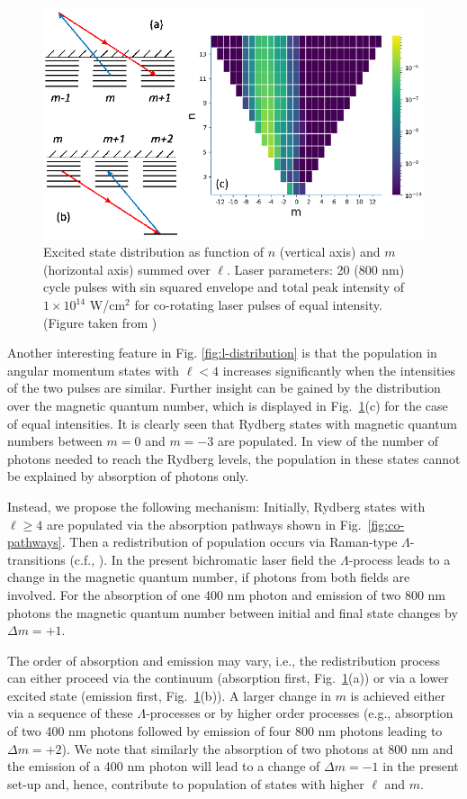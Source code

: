 \begin{figure}[!ht]
\centering
\includegraphics[width=0.6\columnwidth]{figs/Rydberg/Gebre-bicircular-Fig4.png}
\caption{\label{fig:nm-distribution}
Excited state distribution as function of $n$ (vertical axis) and $m$ (horizontal axis) summed over $\ell$. Laser parameters: 20 (800 nm) cycle pulses with sin squared envelope and total peak intensity of $1\times10^{14}$ W/cm$^2$ for co-rotating laser pulses of equal intensity. (Figure taken from \cite{venzke2020_ryd})
}
\end{figure}

Another interesting feature in Fig. \ref{fig:l-distribution} is that the population in angular momentum states with $\ell < 4$ increases significantly when the intensities of the two pulses are similar. Further insight can be gained by the distribution over the magnetic quantum number, which is displayed in Fig.~\ref{fig:nm-distribution}(c) for the case of equal intensities. It is clearly seen that Rydberg states with magnetic quantum numbers between $m=0$ and $m=-3$ are populated. In view of the number of photons needed to reach the Rydberg levels, the population in these states cannot be explained by absorption of photons only. 

Instead, we propose the following mechanism: Initially, Rydberg states with $\ell \ge 4$ are populated via the absorption pathways shown in Fig.\ \ref{fig:co-pathways}. Then a redistribution of population occurs via Raman-type $\Lambda$-transitions (c.f., \cite{gray1978,fedorov1996}). In the present bichromatic laser field the $\Lambda$-process leads to a change in the magnetic quantum number, if photons from both fields are involved. For the absorption of one 400 nm photon and emission of two 800 nm photons the magnetic quantum number between initial and final state changes by $\Delta m = +1$.
 
The order of absorption and emission may vary, i.e., the redistribution process can either proceed via the continuum (absorption first, Fig.~\ref{fig:nm-distribution}(a)) or via a lower excited state (emission first, Fig.~\ref{fig:nm-distribution}(b)). A larger change in $m$ is achieved either via a sequence of these $\Lambda$-processes or by higher order processes (e.g., absorption of two 400 nm photons followed by emission of four 800 nm photons leading to $\Delta m = +2$). We note that similarly the absorption of two photons at 800 nm and the emission of a 400 nm photon will lead to a change of $\Delta m = -1$ in the present set-up and, hence, contribute to population of states with higher $\ell$ and $m$.

